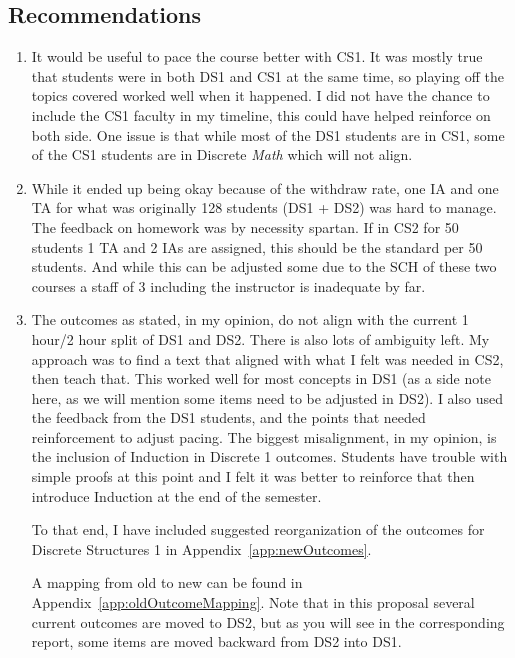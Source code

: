 \documentclass[11pt]{article}
\begin{document}
\subsection{Recommendations}
\begin{enumerate}
\item It would be useful to pace the course better with CS1. 
It was mostly true that students were in both DS1 and CS1 at the same time, so playing off the topics covered worked well when it happened. 
I did not have the chance to include the CS1 faculty in my timeline, this could have helped reinforce on both side. 
One issue is that while most of the DS1 students are in CS1, some of the CS1 students are in Discrete \textit{Math} which will not align. 

\item While it ended up being okay because of the withdraw rate, 
one IA and one TA for what was originally 128 students (DS1 + DS2) was hard to manage. 
The feedback on homework was by necessity spartan.
If in CS2 for 50 students 1 TA and 2 IAs are assigned, this should be the standard per 50 students. 
And while this can be adjusted some due to the SCH of these two courses a staff of 3 including the instructor is inadequate by far. 

\item The outcomes as stated, in my opinion, do not align with the current 1 hour/2 hour split of DS1 and DS2. 
There is also lots of ambiguity left.
My approach was to find a text that aligned with what I felt was needed in CS2, then teach that. 
This worked well for most concepts in DS1 (as a side note here, as we will mention some items need to be adjusted in DS2). 
I also used the feedback from the DS1 students, and the points that needed reinforcement to adjust pacing. 
The biggest misalignment, in my opinion, is the inclusion of Induction in Discrete 1 outcomes. 
Students have trouble with simple proofs at this point and I felt it was better to reinforce that then introduce Induction at the end of the semester. 

To that end, I have included suggested reorganization of the outcomes for Discrete Structures 1 in Appendix~\ref{app:newOutcomes}. 

A mapping from old to new can be found in Appendix~\ref{app:oldOutcomeMapping}. 
Note that in this proposal several current outcomes are moved to DS2, but as you will see in the corresponding report,  
some items are moved backward from DS2 into DS1. 
\end{enumerate}
\end{document}
